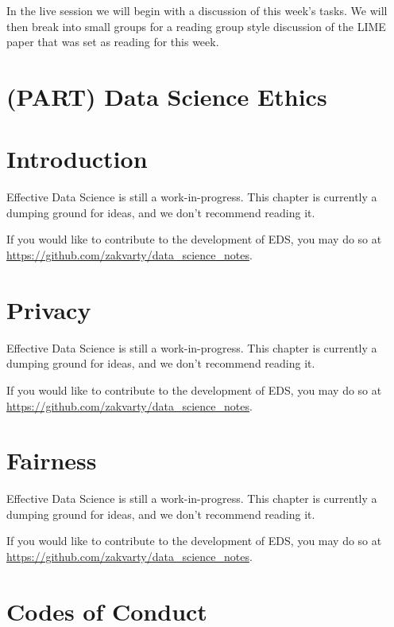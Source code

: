 \documentclass[
  12pt,
]{book}
\begin{document}
In the live session we will begin with a discussion of this week's tasks. We will then break into small groups for a reading group style discussion of the LIME paper that was set as reading for this week.

\hypertarget{part-data-science-ethics}{%
\chapter{(PART) Data Science Ethics}\label{part-data-science-ethics}}

\hypertarget{ethics-introduction}{%
\chapter*{Introduction}\label{ethics-introduction}}

Effective Data Science is still a work-in-progress. This chapter is currently a dumping ground for ideas, and we don't recommend reading it.

If you would like to contribute to the development of EDS, you may do so at \url{https://github.com/zakvarty/data_science_notes}.

\hypertarget{ethics-privacy}{%
\chapter{Privacy}\label{ethics-privacy}}

Effective Data Science is still a work-in-progress. This chapter is currently a dumping ground for ideas, and we don't recommend reading it.

If you would like to contribute to the development of EDS, you may do so at \url{https://github.com/zakvarty/data_science_notes}.

\hypertarget{ethics-fairness}{%
\chapter{Fairness}\label{ethics-fairness}}

Effective Data Science is still a work-in-progress. This chapter is currently a dumping ground for ideas, and we don't recommend reading it.

If you would like to contribute to the development of EDS, you may do so at \url{https://github.com/zakvarty/data_science_notes}.

\hypertarget{ethics-conduct}{%
\chapter{Codes of Conduct}\label{ethics-conduct}}
\end{document}
